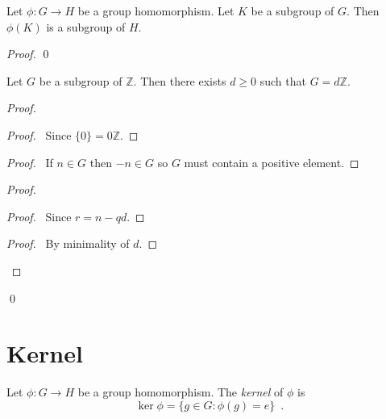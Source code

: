 \begin{cor}
Let $\phi : G \rightarrow H$ be a group homomorphism. Let $K$ be a subgroup of $G$. Then $\phi(K)$ is a subgroup of $H$.
\end{cor}

\begin{proof}
\pf
{}
\qed
\end{proof}

\begin{prop}
\label{prop:subgroups-of-Z}
Let $G$ be a subgroup of $\mathbb{Z}$. Then there exists $d \geq 0$ such that $G = d \mathbb{Z}$.
\end{prop}

\begin{proof}
\pf
{}
\begin{proof}
\pf\ Since $\{0\} = 0 \mathbb{Z}$.
\end{proof}
\begin{proof}
\pf\ If $n \in G$ then $-n \in G$ so $G$ must contain a positive element.
\end{proof}
\begin{proof}
	\begin{proof}
		\pf\ Since $r = n - qd$.
	\end{proof}
	\begin{proof}
		\pf\ By minimality of $d$.
	\end{proof}
\end{proof}
\qed
\end{proof}

\section{Kernel}

\begin{df}[Kernel]
Let $\phi : G \rightarrow H$ be a group homomorphism. The \emph{kernel} of $\phi$ is
\[ \ker \phi = \{ g \in G : \phi(g) = e \} \enspace . \]
\end{df}

